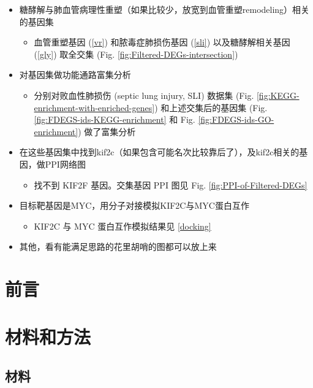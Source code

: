 \documentclass[
]{article}
\providecommand{\tightlist}{%
  \setlength{\itemsep}{0pt}\setlength{\parskip}{0pt}}
\begin{document}
\begin{itemize}
\tightlist
\item
  糖酵解与肺血管病理性重塑（如果比较少，放宽到血管重塑remodeling）相关的基因集

  \begin{itemize}
  \tightlist
  \item
    血管重塑基因 (\ref{vr}) 和脓毒症肺损伤基因 (\ref{sli}) 以及糖酵解相关基因 (\ref{gly}) 取全交集 (Fig. \ref{fig:Filtered-DEGs-intersection})
  \end{itemize}
\item
  对基因集做功能通路富集分析

  \begin{itemize}
  \tightlist
  \item
    分别对败血性肺损伤 (septic lung injury, SLI) 数据集 (Fig. \ref{fig:KEGG-enrichment-with-enriched-genes}) 和上述交集后的基因集 (Fig. \ref{fig:FDEGS-ids-KEGG-enrichment} 和 Fig. \ref{fig:FDEGS-ids-GO-enrichment}) 做了富集分析
  \end{itemize}
\item
  在这些基因集中找到kif2c（如果包含可能名次比较靠后了），及kif2c相关的基因，做PPI网络图

  \begin{itemize}
  \tightlist
  \item
    找不到 KIF2F 基因。交集基因 PPI 图见 Fig. \ref{fig:PPI-of-Filtered-DEGs}
  \end{itemize}
\item
  目标靶基因是MYC，用分子对接模拟KIF2C与MYC蛋白互作

  \begin{itemize}
  \tightlist
  \item
    KIF2C 与 MYC 蛋白互作模拟结果见 \ref{docking}
  \end{itemize}
\item
  其他，看有能满足思路的花里胡哨的图都可以放上来
\end{itemize}

\hypertarget{introduction}{%
\section{前言}\label{introduction}}

\hypertarget{methods}{%
\section{材料和方法}\label{methods}}

\hypertarget{ux6750ux6599}{%
\subsection{材料}\label{ux6750ux6599}}
\end{document}
